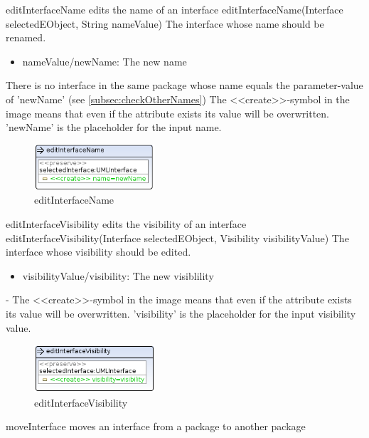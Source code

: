 \op
{editInterfaceName}
{edits the name of an interface}
{editInterfaceName(Interface selectedEObject, String nameValue)}
{The interface whose name should be renamed.}
{
\begin{itemize}
 \item nameValue/newName: The new name
\end{itemize}
}
{There is no interface in the same package whose name equals the parameter-value of
'newName' (see
\ref{subsec:checkOtherNames})}
{The \textless\textless create\textgreater\textgreater  -symbol in the image
means that even if the attribute exists its value will be overwritten.
'newName' is the placeholder for the input name.}
\begin{figure}[H]
  \centering
  \includegraphics[width=0.4\textwidth]{pics/editInterfaceName.png}
  \caption{editInterfaceName}
  \label{editInterfaceName}
\end{figure}
\op
{editInterfaceVisibility}
{edits the visibility of an interface}
{editInterfaceVisibility(Interface selectedEObject, Visibility visibilityValue)}
{The interface whose visibility should be edited.}
{
\begin{itemize}
 \item visibilityValue/visibility: The new visiblility
\end{itemize}
}
{-}
{The \textless\textless create\textgreater\textgreater  -symbol in the image
means that even if the attribute exists its value will be overwritten.
'visibility' is the placeholder for the input visibility value.}
\begin{figure}[H]
  \centering
  \includegraphics[width=0.4\textwidth]{pics/editInterfaceVisibility.png}
  \caption{editInterfaceVisibility}
  \label{editInterfaceVisibility}
\end{figure}
\op
{moveInterface}
{moves an interface from a package to another package}
